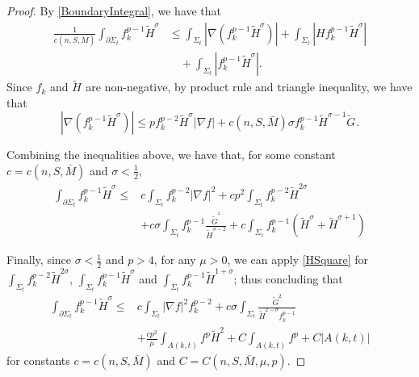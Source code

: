 \begin{proof}
    By \autoref{BoundaryIntegral}, we have that 
    \begin{equation*}
    \begin{split}
        \frac{1}{c(n,S,\bar{M})}\int_{\partial \Sigma_t} f_{k}^{p-1} \tilde{H}^{\sigma }  &\leq \int_{\Sigma_t} \left| \nabla \left( f_{k}^{p-1} \tilde{H}^{\sigma }  \right)  \right| + \int_{\Sigma_t} \left| H f_{k}^{p-1} \tilde{H}^{\sigma } \right|\\ 
        & \quad + \int_{\Sigma_t} \left| f_{k}^{p-1} \tilde{H}^{\sigma } \right|. 
    \end{split}
    \end{equation*} 
    Since $f_{k}^{} $ and $\tilde{H}^{} $ are non-negative, by product rule and triangle inequality, we have that
    \[
        \left| \nabla \left( f_{k}^{p-1} \tilde{H}^{\sigma }  \right)  \right| \leq p f_{k}^{p-2} \tilde{H}^{\sigma } \left| \nabla f \right| +c(n,S,\bar{M}) \sigma f_{k}^{p-1} \tilde{H}^{\sigma -1} \tilde{G}^{} .
    \]

    Combining the inequalities above, we have that, for some constant $c=c(n,S,\bar{M})$ and $\sigma < \frac{1}{2}$,
    \begin{equation*}
    \begin{split}
        \int_{\partial \Sigma_t} f_{k}^{p-1} \tilde{H}^{\sigma }  
    \leq &c \int_{\Sigma_t} f_{k}^{p-2} \left| \nabla f \right| ^2 +cp^2 \int_{\Sigma_t} 
    f_{k}^{p-2} \tilde{H}^{2 \sigma } \\
    &+c \sigma \int_{\Sigma_t} f_{k}^{p-1} \frac{\tilde{G}^{^2} }{\tilde{H}^{\sigma -2} }+c \int_{\Sigma_t} f_{k}^{p-1} \left( \tilde{H}^{\sigma } +\tilde{H}^{\sigma +1}  \right) 
    \end{split}
    \end{equation*} 

    Finally, since $\sigma < \frac{1}{2}$ and $p>4$, for any $\mu >0$, we can apply \autoref{HSquare} for $\int_{\Sigma_t} f_{k}^{p-2} \tilde{H}^{2 \sigma }  $, $\int_{\Sigma_t} f_{k}^{p-1} \tilde{H}^{ \sigma }  $ and $\int_{\Sigma_t} f_{k}^{p-1} \tilde{H}^{1+ \sigma }  $; thus concluding that
    \begin{equation*}
        \begin{split}
            \int_{\partial \Sigma_t} f_{k}^{p-1}\tilde{H}^{\sigma } 
        \leq & c \int_{\Sigma_t} \left| \nabla f \right| ^2 f_{k}^{p-2} +c \sigma \int_{\Sigma_t} \frac{\tilde{G}^{2} }{\tilde{H}^{2-\sigma } f_{k}^{p-1} } \\
        &+ \frac{cp^2}{\mu }\int_{A(k,t)}^{}f^p \tilde{H}^{2} + C \int_{A(k,t)}^{}f^p + C \left| A(k,t) \right|
        \end{split}
        \end{equation*}
        for constants $c=c(n,S,\bar{M})$ and $C=C(n,S,\bar{M},\mu ,p)$.
\end{proof}

